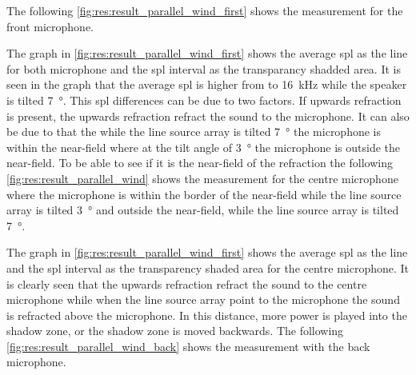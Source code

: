  The following \autoref{fig:res:result_parallel_wind_first}  shows the measurement for the front microphone.

  
The graph in \autoref{fig:res:result_parallel_wind_first} shows the average \gls{spl} as the line for both microphone and the \gls{spl} interval as the transparancy shadded area.
It is seen in the graph that the average \gls{spl} is higher from  to \SI{16}{\kilo\hertz} while the speaker is tilted \SI{7}{\degree}. This \gls{spl} differences can be due to two factors. If upwards refraction is present, the upwards refraction refract the sound to the microphone. It can also be due to that the while the line source array is tilted \SI{7}{\degree} the microphone is within the near-field where at the tilt angle of \SI{3}{\degree} the microphone is outside the near-field. To be able to see if it is the near-field of the refraction the following \autoref{fig:res:result_parallel_wind} shows the measurement for the centre microphone where the microphone is within the border of the near-field while the line source array is tilted \SI{3}{\degree} and outside the near-field, while the line source array is tilted \SI{7}{\degree}.
 
  
  
 
 
 The graph in \autoref{fig:res:result_parallel_wind_first} shows the average \gls{spl} as the line  and the \gls{spl} interval as the transparency shaded area for the centre microphone. It is clearly seen that the upwards refraction refract the sound to the centre microphone while when the line source array point to the microphone the sound is refracted above the microphone. In this distance, more power is played into the shadow zone, or the shadow zone is moved backwards. The following \autoref{fig:res:result_parallel_wind_back} shows the measurement with the back microphone.
 
